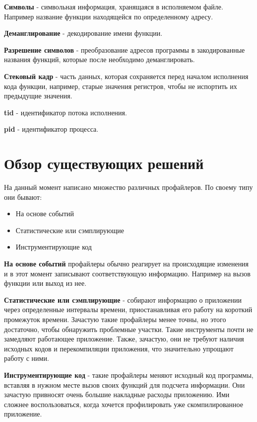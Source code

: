     \textbf{Символы} - символьная информация, хранящаяся в исполняемом файле. Например название функции находящейся по определенному адресу.
        
    \textbf{Деманглирование} - декодирование имени функции. 
    
    \textbf{Разрешение символов} - преобразование адресов программы в закодированные названия функций, которые после необходимо деманглировать.
    
    
    \textbf{Стековый кадр} - часть данных, которая сохраняется перед началом исполнения кода функции, например, старые значения регистров, чтобы не испортить их предыдущие значения.
        
    \textbf{tid} - идентификатор потока исполнения.
    
    \textbf{pid} - идентификатор процесса.


\section{Обзор существующих решений}

	На данный момент написано множество различных профайлеров. По своему типу они бывают:
    \begin{itemize}
    	\item На основе событий
        \item Статистические или сэмплирующие
        \item Инструментирующие код
    \end{itemize}
    
    \textbf{На основе событий} профайлеры обычно реагирует на происходящие изменения и в этот момент записывают соответствующую информацию. Например на вызов функции или выход из нее. 
    
    \textbf{Статистические или сэмплирующие} - собирают информацию о приложении через определенные интервалы времени, приостанавливая его работу на короткий промежуток времени. Зачастую такие профайлеры менее точны, но этого достаточно, чтобы обнаружить проблемные участки. Такие инструменты почти не замедляют работающее приложение. Также, зачастую, они не требуют наличия исходных кодов и перекомпиляции приложения, что значительно упрощают работу с ними.
    
    \textbf{Инструментирующие код} - такие профайлеры меняют исходный код программы, вставляя в нужном месте вызов своих функций для подсчета информации. Они зачастую привносят очень большие накладные расходы приложению. Ими сложнее воспользоваться, когда хочется профилировать уже скомпилированное приложение.
    

